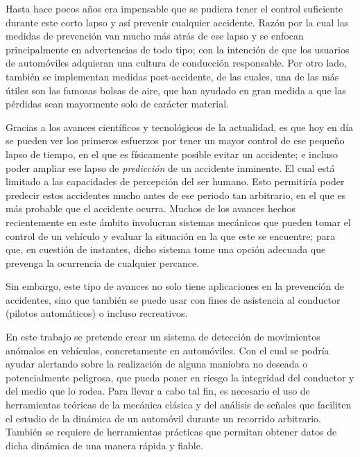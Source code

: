 Hasta hace pocos años era impensable que se pudiera tener el control suficiente durante este corto lapso y así prevenir cualquier accidente. 
Razón por la cual las medidas de prevención van mucho más atrás de ese lapso y se enfocan principalmente en advertencias de todo tipo; con la intención de que los usuarios de automóviles adquieran una cultura de conducción responsable. 
Por otro lado, también se implementan medidas post-accidente, de las cuales, una de las más útiles son las famosas bolsas de aire, que han ayudado en gran medida a que las pérdidas sean mayormente solo de carácter material.

Gracias a los avances científicos y tecnológicos de la actualidad, es que hoy en día se pueden ver los primeros esfuerzos por tener un mayor control de ese pequeño lapso de tiempo, en el que es físicamente posible evitar un accidente; e incluso poder ampliar ese lapso de {\em predicción} de un accidente inminente. 
El cual está limitado a las capacidades de percepción del ser humano. 
Esto permitiría poder predecir estos accidentes mucho antes de ese periodo tan arbitrario, en el que es más probable que el accidente ocurra. 
Muchos de los avances hechos recientemente en este ámbito involucran sistemas mecánicos que pueden tomar el control de un vehículo y evaluar la situación en la que este se encuentre; para que, en cuestión de instantes, dicho sistema tome una opción adecuada que prevenga la ocurrencia de cualquier percance.

Sin embargo, este tipo de avances no solo tiene aplicaciones en la prevención de accidentes, sino que también se puede usar con fines de asistencia al conductor (pilotos automáticos) o incluso recreativos.

En este trabajo se pretende crear un sistema de detección de movimientos anómalos en vehículos, concretamente en automóviles.
Con el cual se podría ayudar alertando sobre la realización de alguna maniobra no deseada o potencialmente peligrosa, que pueda poner en riesgo la integridad del conductor y del medio que lo rodea.
Para llevar a cabo tal fin, es necesario el uso de herramientas teóricas de la mecánica clásica y del análisis de señales que faciliten el estudio de la dinámica de un automóvil durante un recorrido arbitrario. 
También se requiere de herramientas prácticas que permitan obtener datos de dicha dinámica de una manera rápida y fiable.

